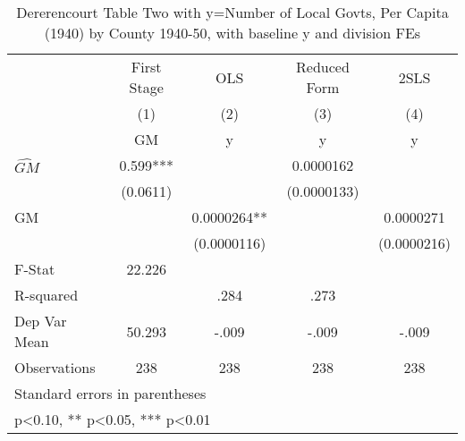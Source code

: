 \begin{table}[htbp]\centering
\def\sym#1{\ifmmode^{#1}\else\(^{#1}\)\fi}
\caption{Dererencourt Table Two with y=Number of Local Govts, Per Capita (1940) by County 1940-50, with baseline y and division FEs}
\begin{tabular}{l*{4}{c}}
\toprule
                    & First Stage   &         OLS   &Reduced Form   &        2SLS   \\
                    &\multicolumn{1}{c}{(1)}&\multicolumn{1}{c}{(2)}&\multicolumn{1}{c}{(3)}&\multicolumn{1}{c}{(4)}\\
                    &\multicolumn{1}{c}{GM}&\multicolumn{1}{c}{y}&\multicolumn{1}{c}{y}&\multicolumn{1}{c}{y}\\
\midrule
$\hat{GM}$          &       0.599***&               &   0.0000162   &               \\
                    &    (0.0611)   &               & (0.0000133)   &               \\
\addlinespace
GM                  &               &   0.0000264** &               &   0.0000271   \\
                    &               & (0.0000116)   &               & (0.0000216)   \\
\midrule
F-Stat              &      22.226   &               &               &               \\
R-squared           &               &        .284   &        .273   &               \\
Dep Var Mean        &      50.293   &       -.009   &       -.009   &       -.009   \\
Observations        &         238   &         238   &         238   &         238   \\
\bottomrule
\multicolumn{5}{l}{\footnotesize Standard errors in parentheses}\\
\multicolumn{5}{l}{\footnotesize * p<0.10, ** p<0.05, *** p<0.01}\\
\end{tabular}
\end{table}
